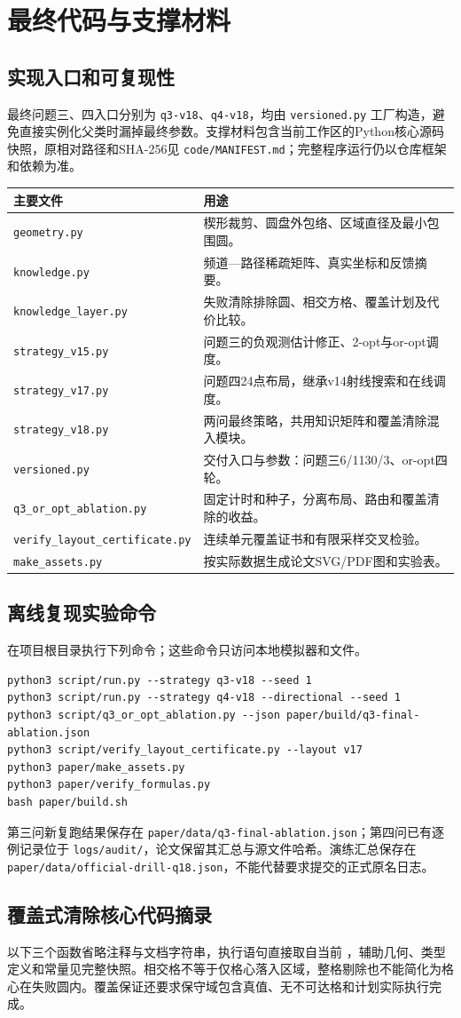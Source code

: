 \section{最终代码与支撑材料}
\subsection{实现入口和可复现性}
最终问题三、四入口分别为 \texttt{q3-v18}、\texttt{q4-v18}，均由 \texttt{versioned.py} 工厂构造，避免直接实例化父类时漏掉最终参数。支撑材料包含当前工作区的Python核心源码快照，原相对路径和SHA-256见 \texttt{code/MANIFEST.md}；完整程序运行仍以仓库框架和依赖为准。
\begin{longtable}{>{\raggedright\arraybackslash\small}p{4.7cm}p{9.1cm}}\toprule
主要文件&用途\\\midrule\endhead
\texttt{geometry.py}&楔形裁剪、圆盘外包络、区域直径及最小包围圆。\\
\texttt{knowledge.py}&频道—路径稀疏矩阵、真实坐标和反馈摘要。\\
\texttt{knowledge\_layer.py}&失败清除排除圆、相交方格、覆盖计划及代价比较。\\
\texttt{strategy\_v15.py}&问题三的负观测估计修正、2-opt与or-opt调度。\\
\texttt{strategy\_v17.py}&问题四24点布局，继承v14射线搜索和在线调度。\\
\texttt{strategy\_v18.py}&两问最终策略，共用知识矩阵和覆盖清除混入模块。\\
\texttt{versioned.py}&交付入口与参数：问题三6/1130/3、or-opt四轮。\\
{\scriptsize\texttt{q3\_or\_opt\_ablation.py}}&固定计时和种子，分离布局、路由和覆盖清除的收益。\\
{\tiny\texttt{verify\_layout\_certificate.py}}&连续单元覆盖证书和有限采样交叉检验。\\
\texttt{make\_assets.py}&按实际数据生成论文SVG/PDF图和实验表。\\\bottomrule
\end{longtable}

\subsection{离线复现实验命令}
在项目根目录执行下列命令；这些命令只访问本地模拟器和文件。
\begin{Verbatim}[fontsize=\scriptsize,frame=single]
python3 script/run.py --strategy q3-v18 --seed 1
python3 script/run.py --strategy q4-v18 --directional --seed 1
python3 script/q3_or_opt_ablation.py --json paper/build/q3-final-ablation.json
python3 script/verify_layout_certificate.py --layout v17
python3 paper/make_assets.py
python3 paper/verify_formulas.py
bash paper/build.sh
\end{Verbatim}
第三问新复跑结果保存在 \texttt{paper/data/q3-final-ablation.json}；第四问已有逐例记录位于 \texttt{logs/audit/}，论文保留其汇总与源文件哈希。演练汇总保存在 \texttt{paper/data/official-drill-q18.json}，不能代替要求提交的正式原名日志。

\subsection{覆盖式清除核心代码摘录}
以下三个函数省略注释与文档字符串，执行语句直接取自当前 ，辅助几何、类型定义和常量见完整快照。相交格不等于仅格心落入区域，整格剔除也不能简化为格心在失败圆内。覆盖保证还要求保守域包含真值、无不可达格和计划实际执行完成。

